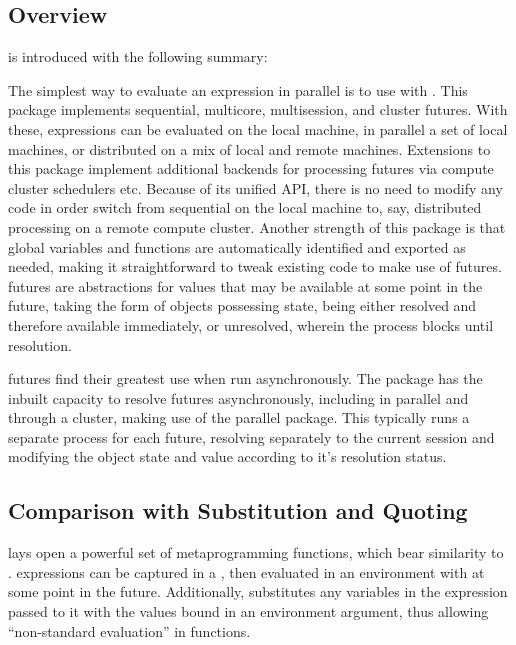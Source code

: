 \subsection{Overview}\label{sec:future-overview}

 is introduced with the following summary:


The simplest way to evaluate an expression in parallel is to use
 with . This package
implements sequential, multicore, multisession, and cluster futures.
With these, \R{} expressions can be evaluated on the local machine, in
parallel a set of local machines, or distributed on a mix of local and
remote machines. Extensions to this package implement additional
backends for processing futures via compute cluster schedulers etc.
Because of its unified API, there is no need to modify any code in order
switch from sequential on the local machine to, say, distributed
processing on a remote compute cluster. Another strength of this package
is that global variables and functions are automatically identified and
exported as needed, making it straightforward to tweak existing code to
make use of futures\cite{bengtsson20}. futures are abstractions for
values that may be available at some point in the future, taking the
form of objects possessing state, being either resolved and therefore
available immediately, or unresolved, wherein the process blocks until
resolution.

futures find their greatest use when run asynchronously. The 
package has the inbuilt capacity to resolve futures asynchronously,
including in parallel and through a cluster, making use of the parallel
package. This typically runs a separate process for each future,
resolving separately to the current \R{} session and modifying the object
state and value according to it's resolution status.

\subsection{Comparison with Substitution and Quoting}\label{subsec:comparison-with-non}

\R{} lays open a powerful set of metaprogramming functions, which bear
similarity to . \R{} expressions can be captured in a , then evaluated in an
environment with  at some point
in the future. Additionally,  substitutes any variables
in the expression passed to it with the values bound in an environment
argument, thus allowing ``non-standard evaluation'' in functions.

